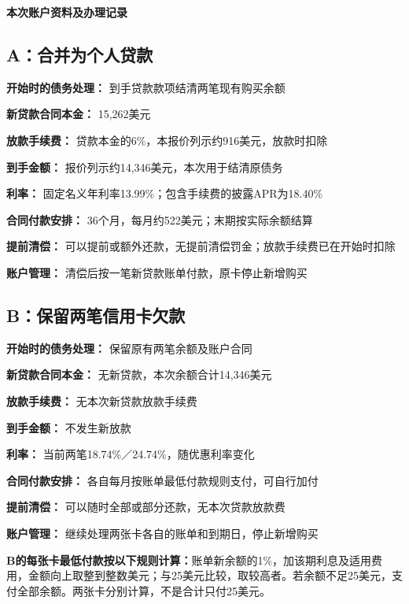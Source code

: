\documentclass[UTF8,fontset=none,11pt,a4paper]{ctexart}
\begin{document}
{\noindent\fontsize{20}{25}\selectfont\bfseries 本次账户资料及办理记录\par}
\vspace{10pt}
\subsection*{A：合并为个人贷款}
\textbf{开始时的债务处理：} 到手贷款款项结清两笔现有购买余额


\textbf{新贷款合同本金：} 15,262美元


\textbf{放款手续费：} 贷款本金的6\%，本报价列示约916美元，放款时扣除


\textbf{到手金额：} 报价列示约14,346美元，本次用于结清原债务


\textbf{利率：} 固定名义年利率13.99\%；包含手续费的披露APR为18.40\%


\textbf{合同付款安排：} 36个月，每月约522美元；末期按实际余额结算


\textbf{提前清偿：} 可以提前或额外还款，无提前清偿罚金；放款手续费已在开始时扣除


\textbf{账户管理：} 清偿后按一笔新贷款账单付款，原卡停止新增购买


\subsection*{B：保留两笔信用卡欠款}
\textbf{开始时的债务处理：} 保留原有两笔余额及账户合同


\textbf{新贷款合同本金：} 无新贷款，本次余额合计14,346美元


\textbf{放款手续费：} 无本次新贷款放款手续费


\textbf{到手金额：} 不发生新放款


\textbf{利率：} 当前两笔18.74\%／24.74\%，随优惠利率变化


\textbf{合同付款安排：} 各自每月按账单最低付款规则支付，可自行加付


\textbf{提前清偿：} 可以随时全部或部分还款，无本次贷款放款费


\textbf{账户管理：} 继续处理两张卡各自的账单和到期日，停止新增购买


\textbf{B的每张卡最低付款按以下规则计算：}账单新余额的1\%，加该期利息及适用费用，金额向上取整到整数美元；与25美元比较，取较高者。若余额不足25美元，支付全部余额。两张卡分别计算，不是合计只付25美元。
\end{document}
